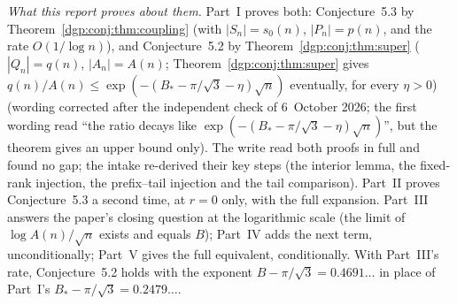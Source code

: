 \documentclass[11pt,letterpaper]{article}
\numberwithin{equation}{section}
\theoremstyle{remark}\newtheorem{remark}[theorem]{Remark}
\begin{document}
\emph{What this report proves about them.} Part~I proves both: Conjecture~5.3 by Theorem~\ref{dgp:conj:thm:coupling} (with $|S_n|=s_0(n)$, $|P_n|=p(n)$, and the rate $O(1/\log n)$), and Conjecture~5.2 by Theorem~\ref{dgp:conj:thm:super} ($|Q_n|=q(n)$, $|A_n|=A(n)$; Theorem~\ref{dgp:conj:thm:super} gives $q(n)/A(n)\le\exp(-(B_*-\pi/\sqrt3-\eta)\sqrt n)$ eventually, for every $\eta>0$) \textup{(wording corrected after the independent check of 6~October 2026; the first wording read ``the ratio decays like $\exp(-(B_*-\pi/\sqrt3-\eta)\sqrt n)$'', but the theorem gives an upper bound only)}. The write read both proofs in full and found no gap; the intake re-derived their key steps (the interior lemma, the fixed-rank injection, the prefix--tail injection and the tail comparison). Part~II proves Conjecture~5.3 a second time, at $r=0$ only, with the full expansion. Part~III answers the paper's closing question at the logarithmic scale (the limit of $\log A(n)/\sqrt n$ exists and equals $B$); Part~IV adds the next term, unconditionally; Part~V gives the full equivalent, conditionally. With Part~III's rate, Conjecture~5.2 holds with the exponent $B-\pi/\sqrt3=0.4691\ldots$ in place of Part~I's $B_*-\pi/\sqrt3=0.2479\ldots$.
\end{document}
